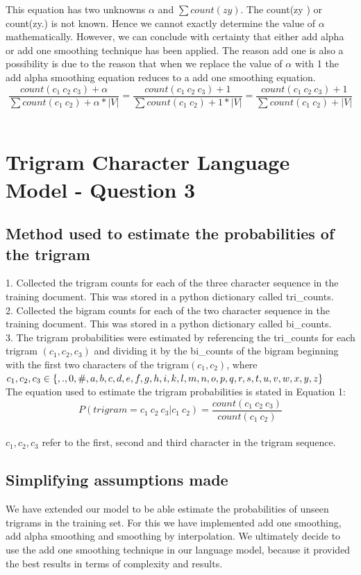 \documentclass[12pt]{article}
\begin{document}
This equation has two unknowns  $\alpha$ and $\sum count(zy)$.
The count(zy ) or count(zy.) is not known. Hence we cannot exactly determine the value of $\alpha$ mathematically. However, we can conclude with certainty that  either add alpha or add one smoothing technique has been applied. The reason add one is also a possibility is due to the reason that when we replace the value of $\alpha$ with 1 the add alpha smoothing equation reduces to a add one smoothing equation.
\begin{equation}
 \dfrac{{count(c_{1}\ c_{2}\ c_{3})} + \alpha} {\sum count(c_1\ c_2)+ \alpha * |V|} = \dfrac{{count(c_{1}\ c_{2}\ c_{3})} + 1} {\sum count(c_1\ c_2)+ 1 * |V|}  = \dfrac{{count(c_{1}\ c_{2}\ c_{3})} + 1} {\sum count(c_1\ c_2)+  |V|}
\end{equation}\\  
\section{Trigram Character Language Model - Question 3}
\subsection{Method used to estimate the probabilities of the trigram}
1. Collected the trigram counts for each of the three character sequence in the training document. This was stored in a python dictionary called tri\_counts.\\
2. Collected the bigram counts for each of the two character sequence in the training document. This was stored in a python dictionary called bi\_counts.\\
3. The trigram probabilities were estimated by referencing the tri\_counts for each trigram $(c_1,c_2,c_3)$ and dividing it by the bi\_counts of the bigram beginning with the first two characters of the trigram$(c_1,c_2)$, where $c_1,c_2,c_3 \in \{ ,.,0,\#,a,b,c,d,e,f,g,h,i,k,l,m,n,o,p,q,\\r,s,t,u,v,w,x,y,z\}$\\
The equation used to estimate the trigram probabilities is stated in Equation 1:
\begin{equation}
P(trigram = c_{1}\ c_{2}\ c_{3}|c_{1}\ c_{2})= \dfrac{count(c_{1}\ c_{2}\ c_{3})}{count(c_1\ c_2)} 
\end{equation}\\
$c_1,c_2,c_3$  refer to the first, second and third character in the trigram sequence.\\
\subsection{Simplifying assumptions made}
We have extended our model to be able estimate the probabilities of unseen trigrams in the training set. For this we have implemented add one smoothing, add alpha smoothing and smoothing by interpolation. We ultimately decide to use the add one smoothing technique in our language model, because it provided the best results in terms of complexity and results.
\end{document}
